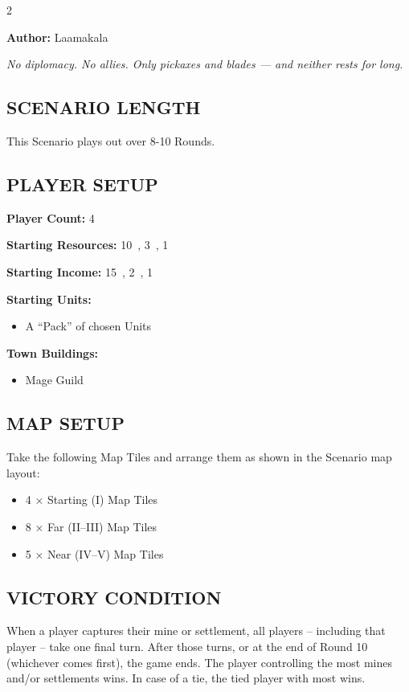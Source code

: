 
\begin{multicols*}{2}

\textbf{Author:} Laamakala

\textit{No diplomacy. No allies. Only pickaxes and blades — and neither rests for long.}

\subsection*{\MakeUppercase{Scenario Length}}
This Scenario plays out over 8-10 Rounds.

\subsection*{\MakeUppercase{Player Setup}}
\textbf{Player Count:} 4

\textbf{Starting Resources:} 10~, 3~, 1~

\textbf{Starting Income:} 15~, 2~, 1~

\textbf{Starting Units:}
\begin{itemize}
  \item A ``Pack'' of chosen  Units
\end{itemize}

\textbf{Town Buildings:}
\begin{itemize}
  \item Mage Guild
\end{itemize}

\subsection*{\MakeUppercase{Map Setup}}
Take the following Map Tiles and arrange them as shown in the Scenario map layout:

\begin{itemize}
  \item 4 × Starting (I) Map Tiles
  \item 8 × Far (II--III) Map Tiles
  \item 5 × Near (IV--V) Map Tiles
\end{itemize}

\subsection*{\MakeUppercase{Victory Condition}}
When a player captures their  mine or settlement, all players -- including that player -- take one final turn. After those turns, or at the end of Round 10 (whichever comes first), the game ends. The player controlling the most mines and/or settlements wins. In case of a tie, the tied player with most  wins.


\end{multicols*}
